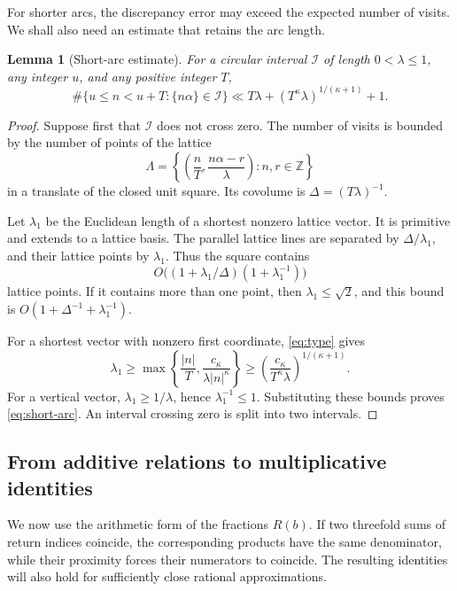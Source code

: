 \documentclass[11pt,reqno]{amsart}
\theoremstyle{definition}
\newcommand{\Z}{\mathbb Z}
\theoremstyle{plain}
\newtheorem{lemma}{Lemma}[section]
\theoremstyle{definition}
\theoremstyle{remark}
\begin{document}
For shorter arcs, the discrepancy error may exceed
the expected number of visits. We shall also need
an estimate that retains the arc length.

\begin{lemma}[Short-arc estimate]\label{lem:short-arc}
For a circular interval $\mathcal I$ of length
$0<\lambda\le1$, any integer $u$, and any
positive integer $T$,
\begin{equation}\label{eq:short-arc}
 \#\{u\le n<u+T:\{n\alpha\}\in\mathcal I\}
 \ll T\lambda+(T^\kappa\lambda)^{1/(\kappa+1)}+1.
\end{equation}
\end{lemma}

\begin{proof}
Suppose first that $\mathcal I$ does not cross
zero. The number of visits is bounded by the
number of points of the lattice
\[
 \Lambda=
 \left\{\left(\frac nT,\frac{n\alpha-r}{\lambda}\right):
 n,r\in\Z\right\}
\]
in a translate of the closed unit square.
Its covolume is $\Delta=(T\lambda)^{-1}$.

Let $\lambda_1$ be the Euclidean length of a
shortest nonzero lattice vector. It is primitive
and extends to a lattice basis. The parallel
lattice lines are separated by $\Delta/\lambda_1$,
and their lattice points by $\lambda_1$.
Thus the square contains
\[
 O\bigl((1+\lambda_1/\Delta)
        (1+\lambda_1^{-1})\bigr)
\]
lattice points. If it contains more than one
point, then $\lambda_1\le\sqrt2$, and this
bound is $O(1+\Delta^{-1}+\lambda_1^{-1})$.

For a shortest vector with nonzero first
coordinate, \eqref{eq:type} gives
\[
 \lambda_1
 \ge\max\left\{
 \frac{|n|}{T},\frac{c_\kappa}{\lambda|n|^\kappa}
 \right\}
 \ge\left(\frac{c_\kappa}
 {T^\kappa\lambda}\right)^{1/(\kappa+1)}.
\]
For a vertical vector,
$\lambda_1\ge1/\lambda$, hence
$\lambda_1^{-1}\le1$.
Substituting these bounds proves
\eqref{eq:short-arc}. An interval crossing
zero is split into two intervals.
\end{proof}

\subsection{From additive relations to multiplicative identities}

We now use the arithmetic form of the fractions
$R(b)$. If two threefold sums of return indices
coincide, the corresponding products have the
same denominator, while their proximity forces
their numerators to coincide. The resulting
identities will also hold for sufficiently close
rational approximations.
\end{document}
